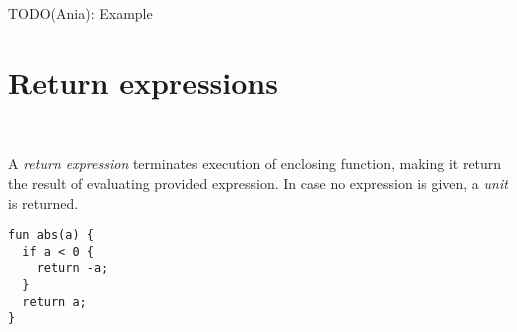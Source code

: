 TODO(Ania): Example

\section{Return expressions}

\begin{bnf}
   \eq {} \ 
\end{bnf}

A \emph{return expression} terminates execution of enclosing function, making it return the result of evaluating provided expression. In case no expression is given, a \emph{unit} is returned.

\begin{example}
\begin{lstlisting}
fun abs(a) {
  if a < 0 {
    return -a;
  }
  return a;
}
\end{lstlisting}
\end{example}
